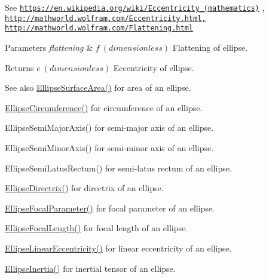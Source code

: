 See \href{https://en.wikipedia.org/wiki/Eccentricity_(mathematics)}{\tt https\+://en.\+wikipedia.\+org/wiki/\+Eccentricity\+\_\+(mathematics)} , \href{http://mathworld.wolfram.com/Eccentricity.html,}{\tt http\+://mathworld.\+wolfram.\+com/\+Eccentricity.\+html,} \href{http://mathworld.wolfram.com/Flattening.html}{\tt http\+://mathworld.\+wolfram.\+com/\+Flattening.\+html} 
\begin{DoxyParams}{Parameters}
{\em flattening} & $ f\ (dimensionless)$ Flattening of ellipse. \\
\hline
\end{DoxyParams}
\begin{DoxyReturn}{Returns}
$ e\ (dimensionless)$ Eccentricity of ellipse. 
\end{DoxyReturn}
\begin{DoxySeeAlso}{See also}
\mbox{\hyperlink{group___e_g_x_math-_geometry-2_d-_ellipse-_surface_area_ga4ce8c8323e9718ce5458f4ab7f6d823d}{Ellipse\+Surface\+Area()}} for area of an ellipse. 

\mbox{\hyperlink{group___e_g_x_math-_geometry-2_d-_ellipse-_circumference_ga4172802ac674eb53467b44928ac635c7}{Ellipse\+Circumference()}} for circumference of an ellipse. 

Ellipse\+Semi\+Major\+Axis() for semi-\/major axis of an ellipse. 

Ellipse\+Semi\+Minor\+Axis() for semi-\/minor axis of an ellipse. 

Ellipse\+Semi\+Latus\+Rectum() for semi-\/latus rectum of an ellipse. 

\mbox{\hyperlink{group___e_g_x_math-_geometry-2_d-_ellipse-_directrix_gace8f72a8efbc9c18d3eb689151405106}{Ellipse\+Directrix()}} for directrix of an ellipse. 

\mbox{\hyperlink{group___e_g_x_math-_geometry-2_d-_ellipse-_focal_parameter_ga4cd01a38c72c092ef9791351948bf69b}{Ellipse\+Focal\+Parameter()}} for focal parameter of an ellipse. 

\mbox{\hyperlink{group___e_g_x_math-_geometry-2_d-_ellipse-_focal_length_gab8d63de7640c880cfecaeada6f2afdac}{Ellipse\+Focal\+Length()}} for focal length of an ellipse. 

\mbox{\hyperlink{group___e_g_x_math-_geometry-2_d-_ellipse-_linear_eccentricity_gac70b3010e30aa8b73deb50fe2b9b9a91}{Ellipse\+Linear\+Eccentricity()}} for linear eccentricity of an ellipse. 

\mbox{\hyperlink{group___e_g_x_math-_geometry-2_d-_ellipse-_inertia_ga10a3049c2f04b50f271fb01dc62e4cf8}{Ellipse\+Inertia()}} for inertial tensor of an ellipse. 
\end{DoxySeeAlso}
\mbox{\label{group___e_g_x_math-_geometry-2_d-_ellipse-_eccentricity_ga4e01cf027d303bb4ecb75606e5240d6c}} 
